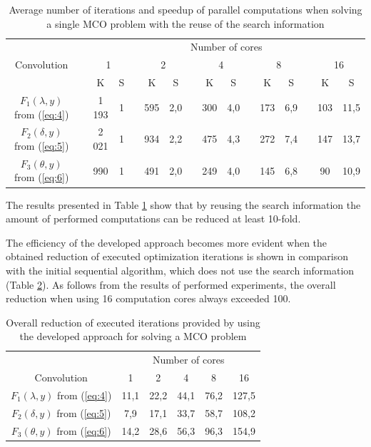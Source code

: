 \documentclass[runningheads]{llncs}
\begin{document}
\begin{table}[t]
\caption{Average number  of iterations and speedup of parallel computations when solving a single MCO problem with the reuse of the search information}\label{tab:2}
\centering
\begin{tabular}{clcclcclcclcclcc}
\hline
           &  & \multicolumn{14}{c}{Number of cores}                                                                                               \\ \cline{3-16}
Convolution&  & \multicolumn{2}{c}{1} &  & \multicolumn{2}{c}{2} &  & \multicolumn{2}{c}{4} &  & \multicolumn{2}{c}{8} &  & \multicolumn{2}{c}{16} \\ \cline{3-4} \cline{6-7} \cline{9-10} \cline{12-13} \cline{15-16} 
           &  & K            & S      &  & K          & S        &  & K          & S        &  & K          & S        &  & K          & S         \\ \cline{1-1} \cline{3-4} \cline{6-7} \cline{9-10} \cline{12-13} \cline{15-16} 
$F_1 (\lambda,y)$ from (\ref{eq:4}) & & 1 193 & 1 & & 595  & 2,0  & & 300 & 4,0  & & 173 & 6,9 & & 103 & 11,5 \\
$F_2 (\delta,y)$ from (\ref{eq:5})  & & 2 021 & 1 & & 934  & 2,2  & & 475 & 4,3  & & 272 & 7,4 & & 147 & 13,7 \\
$F_3 (\theta,y)$ from (\ref{eq:6})  & & 990	  & 1 & & 491  & 2,0  & & 249 & 4,0  & & 145 & 6,8 & & 90	 & 10,9 \\ \hline
\end{tabular}
\end{table}

The results presented in Table \ref{tab:2} show  that by reusing the search information the amount of performed computations can be reduced at least 10-fold.

The efficiency of the developed approach becomes more evident when the obtained reduction of executed optimization iterations is shown in comparison with the initial sequential algorithm, which does not use the search information (Table \ref{tab:3}). As follows from the results of performed experiments, the overall reduction when using 16 computation cores always exceeded 100.

\begin{table}[t]
\caption{Overall reduction of executed iterations provided by using the developed approach for solving a MCO problem}\label{tab:3}
\centering
\begin{tabular}{cccccc}
\hline
                  & \multicolumn{5}{c}{Number of cores} \\ \cline{2-6} 
Convolution       & 1     & 2     & 4    & 8    & 16    \\ \hline
$F_1 (\lambda,y)$ from (\ref{eq:4}) & 11,1  & 22,2  & 44,1 & 76,2 & 127,5 \\
$F_2 (\delta,y)$  from (\ref{eq:5}) & 7,9   & 17,1  & 33,7 & 58,7 & 108,2 \\
$F_3 (\theta,y)$  from (\ref{eq:6}) & 14,2  & 28,6  & 56,3 & 96,3 & 154,9 \\ \hline
\end{tabular}
\end{table}
\end{document}

